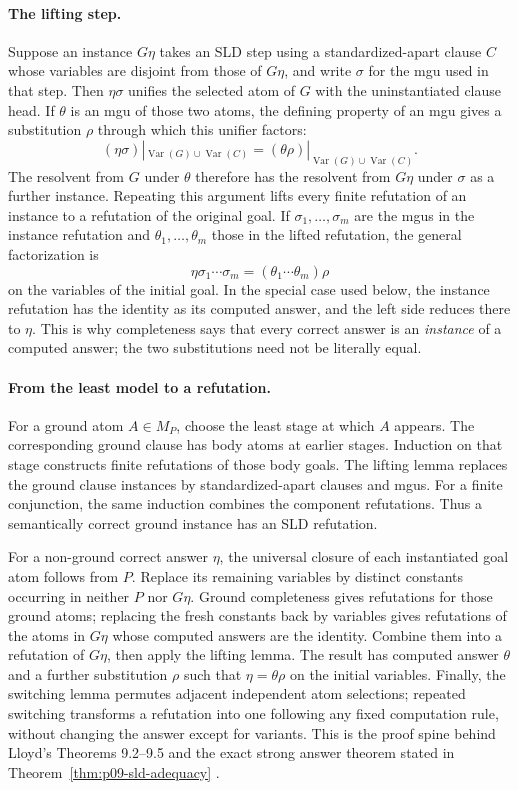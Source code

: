 \paragraph{The lifting step.}
Suppose an instance \(G\eta\) takes an SLD step using a standardized-apart
clause \(C\) whose variables are disjoint from those of \(G\eta\), and write
\(\sigma\) for the mgu used in that step.  Then \(\eta\sigma\) unifies the
selected atom of \(G\) with the uninstantiated clause head.  If \(\theta\) is
an mgu of those two atoms, the defining property of an mgu gives a substitution
\(\rho\) through which this unifier factors:
\[
 (\eta\sigma)|_{\operatorname{Var}(G)\cup\operatorname{Var}(C)}
 =
 (\theta\rho)|_{\operatorname{Var}(G)\cup\operatorname{Var}(C)}.
\]
The resolvent from \(G\) under \(\theta\) therefore has the resolvent from
\(G\eta\) under \(\sigma\) as a further instance.  Repeating this argument
lifts every finite refutation of an instance to a refutation of the original
goal.  If \(\sigma_1,\ldots,\sigma_m\) are the mgus in the instance
refutation and \(\theta_1,\ldots,\theta_m\) those in the lifted refutation, the
general factorization is
\[
 \eta\sigma_1\cdots\sigma_m
   =(\theta_1\cdots\theta_m)\rho
\]
on the variables of the initial goal.  In the special case used below, the
instance refutation has the identity as its computed answer, and the left side
reduces there to \(\eta\).  This is why completeness says that every correct
answer is an \emph{instance} of a computed answer; the two substitutions need
not be literally equal.

\paragraph{From the least model to a refutation.}
For a ground atom \(A\in M_P\), choose the least stage at which \(A\) appears.
The corresponding ground clause has body atoms at earlier stages.  Induction
on that stage constructs finite refutations of those body goals.  The lifting
lemma replaces the ground clause instances by standardized-apart clauses and
mgus.  For a finite conjunction, the same induction combines the component
refutations.  Thus a semantically correct ground instance has an SLD
refutation.

For a non-ground correct answer \(\eta\), the universal closure of each
instantiated goal atom follows from \(P\).  Replace its remaining variables by
distinct constants occurring in neither \(P\) nor \(G\eta\).  Ground
completeness gives refutations for those ground atoms; replacing the fresh
constants back by variables gives
refutations of the atoms in \(G\eta\) whose computed answers are the identity.
Combine them into a refutation of \(G\eta\), then apply the lifting lemma.  The
result has computed answer \(\theta\) and a further substitution \(\rho\) such
that \(\eta=\theta\rho\) on the initial variables.  Finally, the switching lemma
permutes adjacent independent atom selections; repeated switching transforms a
refutation into one following any fixed computation rule, without changing the
answer except for variants.  This is the proof spine behind Lloyd's Theorems
9.2--9.5 and the exact strong answer theorem stated in
Theorem~\ref{thm:p09-sld-adequacy}
\cite[ch.~2, \S\S8--9]{Lloyd1987}.

